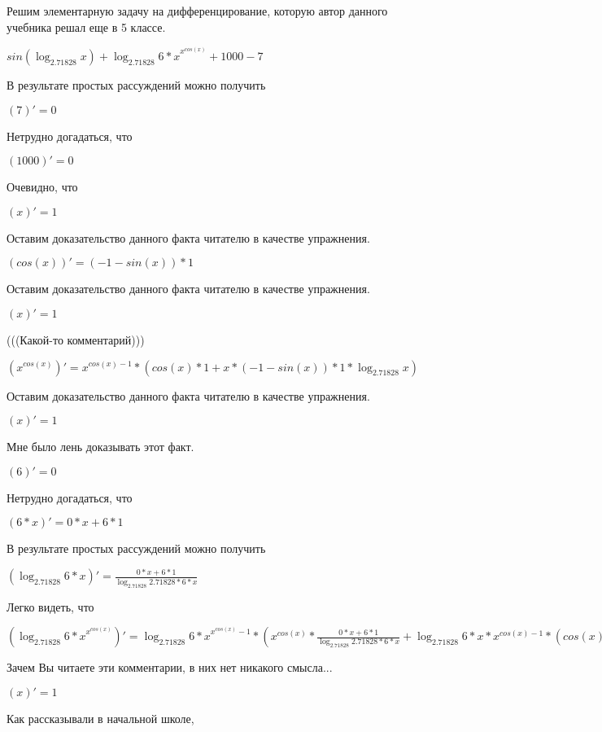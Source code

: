 \documentclass[12pt,a4paper,fleqn]{article}
\theoremstyle{definition}
\begin{document}
Решим элементарную задачу на дифференцирование, которую автор данного учебника решал еще в 5 классе.


$sin(\log_{ 2.71828 }{ x }) + {\log_{ 2.71828 }{ 6  *  x }}^{{ x }^{cos( x )}} +  1000  -  7 $

В результате простых рассуждений можно получить

$( 7 )' =  0 $

Нетрудно догадаться, что

$( 1000 )' =  0 $

Очевидно, что

$( x )' =  1 $

Оставим доказательство данного факта читателю в качестве упражнения.

$(cos( x ))' = ( -1  - sin( x )) *  1 $

Оставим доказательство данного факта читателю в качестве упражнения.

$( x )' =  1 $

(((Какой-то комментарий)))

$({ x }^{cos( x )})' = { x }^{cos( x ) -  1 } * (cos( x ) *  1  +  x  * ( -1  - sin( x )) *  1  * \log_{ 2.71828 }{ x })$

Оставим доказательство данного факта читателю в качестве упражнения.

$( x )' =  1 $

Мне было лень доказывать этот факт.

$( 6 )' =  0 $

Нетрудно догадаться, что

$( 6  *  x )' =  0  *  x  +  6  *  1 $

В результате простых рассуждений можно получить

$(\log_{ 2.71828 }{ 6  *  x })' = \frac{ 0  *  x  +  6  *  1 }{\log_{ 2.71828 }{ 2.71828 } *  6  *  x }
$

Легко видеть, что

$({\log_{ 2.71828 }{ 6  *  x }}^{{ x }^{cos( x )}})' = {\log_{ 2.71828 }{ 6  *  x }}^{{ x }^{cos( x )} -  1 } * ({ x }^{cos( x )} * \frac{ 0  *  x  +  6  *  1 }{\log_{ 2.71828 }{ 2.71828 } *  6  *  x }
 + \log_{ 2.71828 }{ 6  *  x } * { x }^{cos( x ) -  1 } * (cos( x ) *  1  +  x  * ( -1  - sin( x )) *  1  * \log_{ 2.71828 }{ x }) * \log_{ 2.71828 }{\log_{ 2.71828 }{ 6  *  x }})$

Зачем Вы читаете эти комментарии, в них нет никакого смысла...

$( x )' =  1 $

Как рассказывали в начальной школе,
\end{document}

